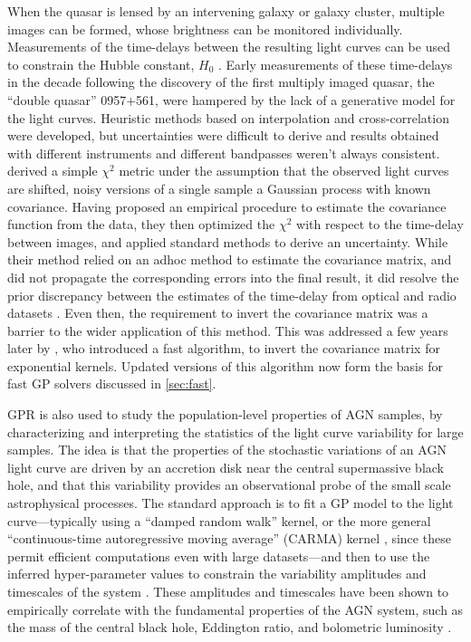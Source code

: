 \documentclass[letterpaper]{ar-1col}
\begin{document}
When the quasar is lensed by an intervening galaxy or galaxy cluster, multiple images can be formed, whose brightness can be monitored individually.
Measurements of the time-delays between the resulting light curves can be used to constrain the Hubble constant, $H_0$ \citep{doi:10.1146/annurev.aa.30.090192.001523}.
Early measurements of these time-delays in the decade following the discovery of the first multiply imaged quasar, the ``double quasar'' 0957$+$561, were hampered by the lack of a generative model for the light curves.
Heuristic methods based on interpolation and cross-correlation were developed, but uncertainties were difficult to derive and results obtained with different instruments and different bandpasses weren't always consistent.
\citet{prh92a} derived a simple $\chi^2$ metric under the assumption that the observed light curves are shifted, noisy versions of a single sample a Gaussian process with known covariance.
Having proposed an empirical procedure to estimate the covariance function from the data, they then optimized the $\chi^2$ with respect to the time-delay between images, and applied standard methods to derive an uncertainty.
While their method relied on an adhoc method to estimate the covariance matrix, and did not propagate the corresponding errors into the final result, it did resolve the prior discrepancy between the estimates of the time-delay from optical and radio datasets \citep{prh92b}.
Even then, the requirement to invert the covariance matrix was a barrier to the wider application of this method.
This was addressed a few years later by \citet{pr95}, who introduced a fast algorithm, to invert the covariance matrix for exponential kernels.
Updated versions of this algorithm now form the basis for fast GP solvers discussed in \autoref{sec:fast}.

GPR is also used to study the population-level properties of AGN samples, by characterizing and interpreting the statistics of the light curve variability for large samples.
The idea is that the properties of the stochastic variations of an AGN light curve are driven by an accretion disk near the central supermassive black hole, and that this variability provides an observational probe of the small scale astrophysical processes.
The standard approach is to fit a GP model to the light curve---typically using a ``damped random walk'' kernel, or the more general ``continuous-time autoregressive moving average'' (CARMA) kernel \citep[e.g.,][]{2014ApJ...788...33K}, since these permit efficient computations even with large datasets---and then to use the inferred hyper-parameter values to constrain the variability amplitudes and timescales of the system \citep[e.g.,][]{2014ApJ...788...33K, 2017MNRAS.470.3027K, 2019PASP..131f3001M, 2022MNRAS.514..164S}.
These amplitudes and timescales have been shown to empirically correlate with the fundamental properties of the AGN system, such as the mass of the central black hole, Eddington ratio, and bolometric luminosity \citep{2022ApJ...936..132Y}.
\end{document}
